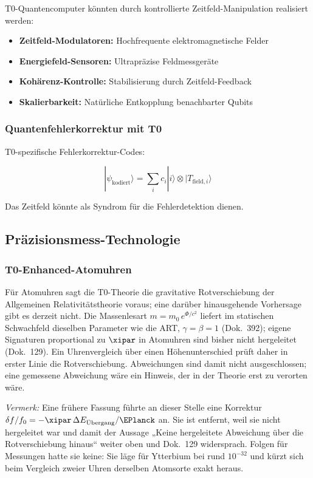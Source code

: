 	T0-Quantencomputer könnten durch kontrollierte Zeitfeld-Manipulation realisiert werden:
	
	\begin{itemize}
		\item \textbf{Zeitfeld-Modulatoren:} Hochfrequente elektromagnetische Felder
		\item \textbf{Energiefeld-Sensoren:} Ultrapräzise Feldmessgeräte
		\item \textbf{Kohärenz-Kontrolle:} Stabilisierung durch Zeitfeld-Feedback
		\item \textbf{Skalierbarkeit:} Natürliche Entkopplung benachbarter Qubits
	\end{itemize}
	
	\subsubsection{Quantenfehlerkorrektur mit T0}
	
	T0-spezifische Fehlerkorrektur-Codes:
	
	\begin{equation}
		|\psi_{\text{kodiert}}\rangle = \sum_i c_i |i\rangle \otimes |T_{\text{field},i}\rangle
	\end{equation}
	
	Das Zeitfeld könnte als Syndrom für die Fehlerdetektion dienen.
	
	\subsection{Präzisionsmess-Technologie}
	
	\subsubsection{T0-Enhanced-Atomuhren}
	
	Für Atomuhren sagt die T0-Theorie die gravitative Rotverschiebung der Allgemeinen Relativitätstheorie voraus; eine darüber hinausgehende Vorhersage gibt es derzeit nicht. Die Massenlesart $m = m_0\,e^{\Phi/c^2}$ liefert im statischen Schwachfeld dieselben Parameter wie die ART, $\gamma = \beta = 1$ (Dok.~392); eigene Signaturen proportional zu $\xipar$ in Atomuhren sind bisher nicht hergeleitet (Dok.~129). Ein Uhrenvergleich über einen Höhenunterschied prüft daher in erster Linie die Rotverschiebung. Abweichungen sind damit nicht ausgeschlossen; eine gemessene Abweichung wäre ein Hinweis, der in der Theorie erst zu verorten wäre.
	
	\textit{Vermerk:} Eine frühere Fassung führte an dieser Stelle eine Korrektur $\delta f/f_0 = -\xipar\,\Delta E_{\text{Übergang}}/\EPlanck$ an. Sie ist entfernt, weil sie nicht hergeleitet war und damit der Aussage „Keine hergeleitete Abweichung über die Rotverschiebung hinaus“ weiter oben und Dok.~129 widersprach. Folgen für Messungen hatte sie keine: Sie läge für Ytterbium bei rund $10^{-32}$ und kürzt sich beim Vergleich zweier Uhren derselben Atomsorte exakt heraus.
	
